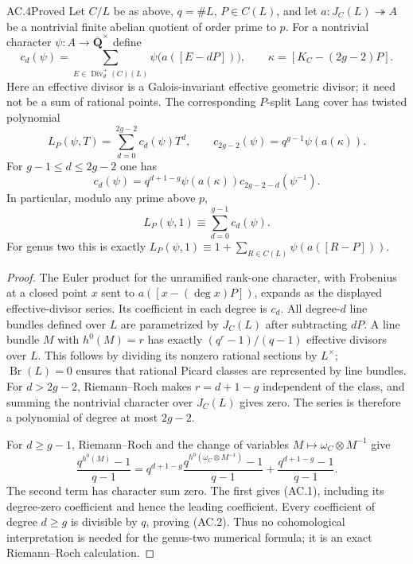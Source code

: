 \begin{claim}{AC.4}{Proved}
Let $C/L$ be as above, $q=\#L$, $P\in C(L)$, and let
$a:J_C(L)\twoheadrightarrow A$ be a nontrivial finite abelian quotient
of order prime to $p$.  For a nontrivial character
$\psi:A\to\overline{\mathbf Q}^{\times}$ define
\[
 c_d(\psi)=\sum_{E\in\operatorname{Div}^{+}_d(C)(L)}
           \psi\bigl(a([E-dP])\bigr),
 \qquad \kappa=[K_C-(2g-2)P].
\]
Here an effective divisor is a Galois-invariant effective geometric
divisor; it need not be a sum of rational points.  The corresponding
$P$-split Lang cover has twisted polynomial
\[
 L_P(\psi,T)=\sum_{d=0}^{2g-2}c_d(\psi)T^d,
 \qquad c_{2g-2}(\psi)=q^{g-1}\psi(a(\kappa)).
\]
For $g-1\le d\le2g-2$ one has
\[
 c_d(\psi)=q^{d+1-g}\psi(a(\kappa))
                   c_{2g-2-d}(\psi^{-1}).                 \tag{AC.1}
\]
In particular, modulo any prime above $p$,
\[
               L_P(\psi,1)\equiv
                  \sum_{d=0}^{g-1}c_d(\psi).             \tag{AC.2}
\]
For genus two this is exactly
$L_P(\psi,1)\equiv1+\sum_{R\in C(L)}\psi(a([R-P]))$.
\end{claim}
\begin{proof}
The Euler product for the unramified rank-one character, with Frobenius
at a closed point $x$ sent to $a([x-(\deg x)P])$, expands as the displayed
effective-divisor series.  Its coefficient in each degree is $c_d$.
All degree-$d$ line bundles defined over $L$ are parametrized by
$J_C(L)$ after subtracting $dP$.  A line bundle $M$ with
$h^0(M)=r$ has exactly $(q^r-1)/(q-1)$ effective divisors over $L$.
This follows by dividing its nonzero rational sections by $L^\times$;
$\operatorname{Br}(L)=0$ ensures that rational Picard classes are represented
by line bundles.  For $d>2g-2$, Riemann--Roch makes $r=d+1-g$
independent of the class, and summing the nontrivial character over
$J_C(L)$ gives zero.  The series is therefore a polynomial of degree at
most $2g-2$.

For $d\ge g-1$, Riemann--Roch and the change of variables
$M\mapsto\omega_C\otimes M^{-1}$ give
\[
 \frac{q^{h^0(M)}-1}{q-1}
 =q^{d+1-g}\frac{q^{h^0(\omega_C\otimes M^{-1})}-1}{q-1}
   +\frac{q^{d+1-g}-1}{q-1}.
\]
The second term has character sum zero.  The first gives (AC.1), including
its degree-zero coefficient and hence the leading coefficient.  Every
coefficient of degree $d\ge g$ is divisible by $q$, proving (AC.2).
Thus no cohomological interpretation is needed for the genus-two numerical
formula; it is an exact Riemann--Roch calculation.
\end{proof}

